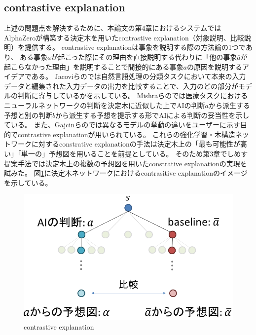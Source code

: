 \subsection{contrastive explanation}
上述の問題点を解決するために、本論文の第4章におけるシステムではAlphaZeroが構築する決定木を用いたcontrastive explanation（対象説明、比較説明）を提供する。
contrastive explanationは事象を説明する際の方法論の1つであり、
ある事象$a$が起こった際にその理由を直接説明する代わりに「他の事象$\bar{a}$が起こらなかった理由」を説明することで間接的にある事象$a$の原因を説明するアイデアである\cite{contrastive}。
Jacoviらの\cite{contrastive}では自然言語処理の分類タスクにおいて本来の入力データと編集された入力データの出力を比較することで、入力のどの部分がモデルの判断に寄与しているかを示している。
Mishraらの\cite{whyNot}では医療タスクにおけるニューラルネットワークの判断を決定木に近似した上でAIの判断$a$から派生する予想と別の判断$b$から派生する予想を提示する形でAIによる判断の妥当性を示している。
また、Gajcinらの\cite{preference}では異なるモデルの挙動の違いをユーザーに示す目的でcontrastive explanationが用いられている。
これらの強化学習・木構造ネットワークに対するconstrative explanationの手法は決定木上の「最も可能性が高い」「単一の」予想図を用いることを前提としている。
そのため第3章でしめす提案手法では決定木上の複数の予想図を用いたconstrative explanationの実現を試みた。
図\ref{fig:contrastive}に決定木ネットワークにおけるcontrasitive explanationのイメージを示している。
\begin{figure}[t]
	\centering
	\includegraphics[width=\linewidth]{./figure/contrastive.png}
	\caption{contrastive explanation}
	\label{fig:contrastive}
\end{figure}
